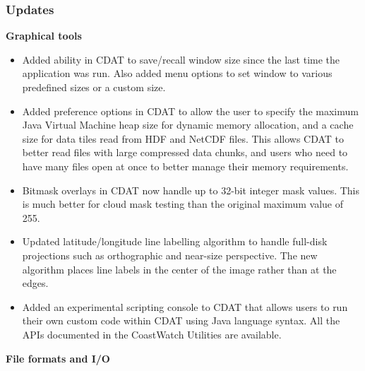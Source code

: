 \subsubsection*{ Updates}

\hspace{0.4cm} {\bf Graphical tools}

\begin{itemize}

  \item Added ability in CDAT to save/recall window size since the last time
  the application was run.  Also added menu options to set window to various
  predefined sizes or a custom size.

  \item Added preference options in CDAT to allow the user to specify the
  maximum Java Virtual Machine heap size for dynamic memory allocation, and
  a cache size for data tiles read from HDF and NetCDF files.  This allows CDAT
  to better read files with large compressed data chunks, and users who need to
  have many files open at once to better manage their memory requirements.

  \item Bitmask overlays in CDAT now handle up to 32-bit integer mask values.
  This is much better for cloud mask testing than the original maximum value
  of 255.

  \item Updated latitude/longitude line labelling algorithm to handle full-disk
  projections such as orthographic and near-size perspective.  The new
  algorithm places line labels in the center of the image rather than at the
  edges.

  \item Added an experimental scripting console to CDAT that allows users to
  run their own custom code within CDAT using Java language syntax.  All the
  APIs documented in the CoastWatch Utilities are available.

\end{itemize}

\hspace{0.4cm} {\bf File formats and I/O}

